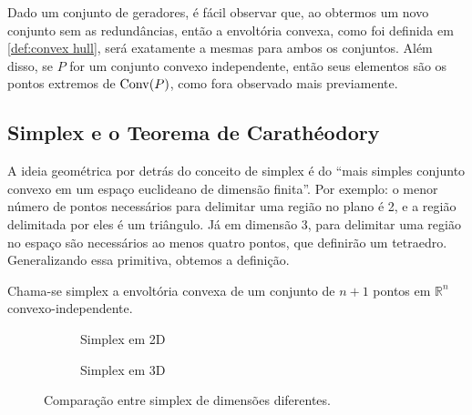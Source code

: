 Dado um conjunto de geradores, é fácil observar que, ao obtermos um
novo conjunto sem as redundâncias, então a envoltória convexa, como
foi definida em \ref{def:convex hull}, será exatamente a mesmas para
ambos os conjuntos. Além disso, se $P$ for um conjunto convexo
independente, então seus elementos são os pontos extremos de \(\mathrm{Conv}(P)\),
como fora observado mais previamente.

\subsection{Simplex e o Teorema de Carathéodory}

A ideia geométrica por detrás do conceito de simplex é do ``mais simples 
conjunto convexo em um espaço euclideano de dimensão finita''. Por exemplo:
o menor número de pontos necessários para delimitar uma região no plano é
2, e a região delimitada por eles é um triângulo. Já em dimensão 3, para
delimitar uma região no espaço são necessários ao menos quatro pontos,
que definirão um tetraedro. Generalizando essa primitiva, obtemos a definição.

\begin{def:simplex}
	Chama-se simplex a envoltória convexa de um conjunto de $n + 1$ pontos
	em $\mathbb{R}^n$ convexo-independente.
\end{def:simplex}

\begin{figure}[h]
	\centering
	\begin{subfigure}{0.45\textwidth}
		\centering
		\caption{Simplex em 2D}
		\label{fig:triangulo}
	\end{subfigure}
	\hfill
	\begin{subfigure}{0.45\textwidth}
		\centering
		\caption{Simplex em 3D}
		\label{fig:tetraedro}
	\end{subfigure}
	\caption{Comparação entre simplex de dimensões diferentes.}
\end{figure}

